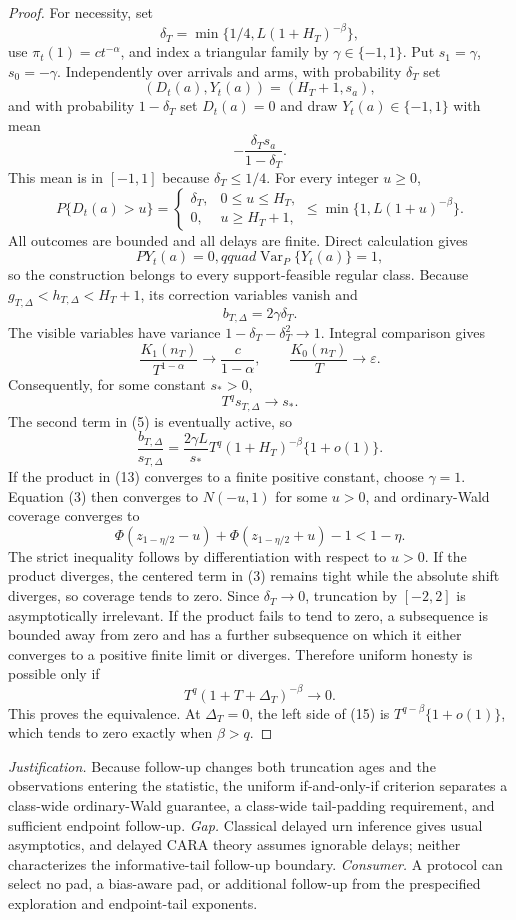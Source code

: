 \documentclass{article}
\begin{document}
\begin{proof}
For necessity, set
\[
 \delta_T=\min\{1/4,L(1+H_T)^{-\beta}\}, \tag{5}
\]
use \(\pi_t(1)=ct^{-\alpha}\), and index a triangular family by \(\gamma\in\{-1,1\}\).  Put \(s_1=\gamma\), \(s_0=-\gamma\).  Independently over arrivals and arms, with probability \(\delta_T\) set
\[
 (D_t(a),Y_t(a))=(H_T+1,s_a), \tag{6}
\]
and with probability \(1-\delta_T\) set \(D_t(a)=0\) and draw \(Y_t(a)\in\{-1,1\}\) with mean
\[
 -\frac{\delta_Ts_a}{1-\delta_T}. \tag{7}
\]
This mean is in \([-1,1]\) because \(\delta_T\leq1/4\).  For every integer \(u\geq0\),
\[
 P\{D_t(a)>u\}=
 \begin{cases}
 \delta_T,&0\leq u\leq H_T,\\
 0,&u\geq H_T+1,
 \end{cases}
 \leq\min\{1,L(1+u)^{-\beta}\}. \tag{8}
\]
All outcomes are bounded and all delays are finite.  Direct calculation gives
\[
 PY_t(a)=0,qquad \operatorname{Var}_P\{Y_t(a)\}=1, \tag{9}
\]
so the construction belongs to every support-feasible regular class.  Because \(g_{T,\Delta}<h_{T,\Delta}<H_T+1\), its correction variables vanish and
\[
 b_{T,\Delta}=2\gamma\delta_T. \tag{10}
\]
The visible variables have variance \(1-\delta_T-\delta_T^2\to1\).  Integral comparison gives
\[
 \frac{K_1(n_T)}{T^{1-\alpha}}\longrightarrow\frac{c}{1-\alpha},
 \qquad \frac{K_0(n_T)}{T}\longrightarrow\varepsilon. \tag{11}
\]
Consequently, for some constant \(s_*>0\),
\[
 T^qs_{T,\Delta}\longrightarrow s_*. \tag{12}
\]
The second term in (5) is eventually active, so
\[
 \frac{b_{T,\Delta}}{s_{T,\Delta}}
 =\frac{2\gamma L}{s_*}T^q(1+H_T)^{-\beta}\{1+o(1)\}. \tag{13}
\]
If the product in (13) converges to a finite positive constant, choose \(\gamma=1\).  Equation (3) then converges to \(N(-u,1)\) for some \(u>0\), and ordinary-Wald coverage converges to
\[
 \Phi(z_{1-\eta/2}-u)+\Phi(z_{1-\eta/2}+u)-1<1-\eta. \tag{14}
\]
The strict inequality follows by differentiation with respect to \(u>0\).  If the product diverges, the centered term in (3) remains tight while the absolute shift diverges, so coverage tends to zero.  Since \(\delta_T\to0\), truncation by \([-2,2]\) is asymptotically irrelevant.  If the product fails to tend to zero, a subsequence is bounded away from zero and has a further subsequence on which it either converges to a positive finite limit or diverges.  Therefore uniform honesty is possible only if
\[
 T^q(1+T+\Delta_T)^{-\beta}\longrightarrow0. \tag{15}
\]
This proves the equivalence.  At \(\Delta_T=0\), the left side of (15) is \(T^{q-\beta}\{1+o(1)\}\), which tends to zero exactly when \(\beta>q\).
\end{proof}
\par\smallskip\noindent \textit{Justification.} Because follow-up changes both truncation ages and the observations entering the statistic, the uniform if-and-only-if criterion separates a class-wide ordinary-Wald guarantee, a class-wide tail-padding requirement, and sufficient endpoint follow-up. \textit{Gap.} Classical delayed urn inference gives usual asymptotics, and delayed CARA theory assumes ignorable delays; neither characterizes the informative-tail follow-up boundary. \textit{Consumer.} A protocol can select no pad, a bias-aware pad, or additional follow-up from the prespecified exploration and endpoint-tail exponents.
\end{document}
